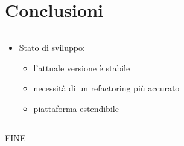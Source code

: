 \documentclass{beamer}
\begin{document}

\section{Conclusioni}
\begin{frame}{\secname}
	\begin{columns}
		\begin{column}{\textwidth}
			\begin{itemize}
				\item Stato di sviluppo:
					\begin{itemize}
						\item l'attuale versione è stabile
						\item necessità di un refactoring più accurato
						\item piattaforma estendibile
					\end{itemize}
			\end{itemize}
		\end{column}
	\end{columns}
\end{frame}
	
\begin{frame}{}
	\centering
	{\large{FINE}}
\end{frame}

\end{document}
